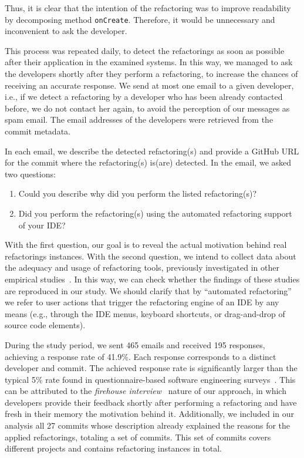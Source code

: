 \margin

Thus, it is clear that the intention of the refactoring was to improve readability by decomposing method 
\texttt{onCreate}. Therefore, it would be unnecessary and inconvenient to ask the developer.

This process was repeated daily, to detect the refactorings as soon as possible after their application in the examined systems.
In this way, we managed to ask the developers shortly after they perform a refactoring, to increase the chances of receiving an accurate response.
We send at most one email to a given developer, i.e., if we detect a refactoring by a developer who has been already contacted before, we do not contact her again, to avoid the perception of our messages as spam email.
The email addresses of the developers were retrieved from the commit metadata.

In each email, we describe the detected refactoring(s) and provide a GitHub URL for the commit where the refactoring(s) is(are) detected.
In the email, we asked two questions:
\begin{enumerate}
\item Could you describe why did you perform the listed refactoring(s)? 
\item Did you perform the refactoring(s) using the automated refactoring support of your IDE?
\end{enumerate}
With the first question, our goal is to reveal the actual motivation behind real refactorings instances.
With the second question, we intend to collect data about the adequacy and usage of refactoring tools, previously investigated in other empirical studies~\citep{MurphyHill2012, negara2013}.
In this way, we can check whether the findings of these studies are reproduced in our study.
We should clarify that by ``automated refactoring'' we refer to user actions that trigger the refactoring engine of an IDE by any means (e.g., through the IDE menus, keyboard shortcuts, or drag-and-drop of source code elements).

During the study period, we sent 465 emails and received 195 responses, achieving a response rate
of 41.9\%. Each response corresponds to a distinct developer and commit.
The achieved response rate is significantly larger than the typical 5\% rate found in questionnaire-based software engineering surveys~\citep{Singer:2008}.
This can be attributed to the \textit{firehouse interview}~\citep{Murphy-Hill:2015} nature of our approach, in which developers provide their feedback
shortly after performing a refactoring and have fresh in their memory the motivation behind it.
Additionally, we included
in our analysis all 27 commits whose description already explained the reasons for the applied refactorings, 
totaling a set of \commitsWithRefactoringAndResponse commits. %
This set of commits covers \studiedProjects different projects and contains \studiedRefactorings refactoring instances in total.


